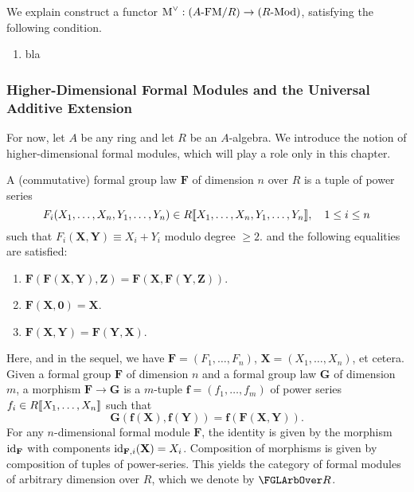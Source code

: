 We explain construct a functor ${\operatorname M}^\vee: {({A}\text-\mathrm{FM}/{R})} \to {({R}\text-\mathrm{Mod})}$, satisfying the 
following condition.
\begin{enumerate}
  \item bla
\end{enumerate}

\subsubsection{Higher-Dimensional Formal Modules and the Universal Additive Extension} %
\label{ssub:Higher-Dimensional Formal Modules and the Universal Additive Extension}
For now, let $A$ be any ring and let $R$ be an $A$-algebra.
We introduce the notion of higher-dimensional formal modules, which will play a role 
only in this chapter. 
\begin{defi}
  A (commutative) formal group law $\mathbf F$ of dimension $n$ over $R$ is a tuple of
  power series $$F_i(X_1, \dots, X_n,Y_1, \dots, Y_n) \in R\llbracket X_1, \dots,
  X_n, Y_1, \dots, Y_n\rrbracket, \quad 1 \leq i \leq n$$
  such that $F_i(\mathbf X, \mathbf Y) \equiv X_i + Y_i $ modulo degree $\geq 2$.
  and the following equalities are satisfied:
  \begin{enumerate}
    \item $\mathbf F(\mathbf F (\mathbf X, \mathbf Y), \mathbf Z) = 
      \mathbf F(\mathbf X, \mathbf F(\mathbf Y, \mathbf Z))$.
    \item $\mathbf F( \mathbf X, \mathbf 0) = \mathbf X$.
    \item $\mathbf F( \mathbf X, \mathbf Y) = \mathbf F(\mathbf Y, \mathbf X).$
  \end{enumerate}
  Here, and in the sequel, we have $\mathbf F = (F_1, \dots, F_n)$, $\mathbf X =
  (X_1, \dots, X_n)$, et cetera.
  Given a formal group $\mathbf F$ of dimension $n$ and a formal group law
  $\mathbf G$ of dimension $m$,
  a morphism $\mathbf F \to \mathbf G$ is a $m$-tuple $\mathbf f = (f_1, \dots, f_m)$ 
  of power series $f_i \in R\llbracket X_1, \dots, X_n \rrbracket$ such that 
  \begin{equation*}
    \mathbf G(\mathbf f( \mathbf X), \mathbf f( \mathbf Y) ) = \mathbf
    f(\mathbf F( \mathbf X, \mathbf Y)).
  \end{equation*}
  For any $n$-dimensional formal module $\mathbf F$, the identity is given by 
  the morphism $\operatorname{id}_{\mathbf F}$ with components $\operatorname{id}_{\mathbf F,i}( \mathbf X) = X_i$. 
  Composition of morphisms is given by composition of tuples of power-series.
  This yields the category of formal modules of arbitrary dimension over $R$,
  which we denote by $\FGLArbOver R$.
\end{defi}
